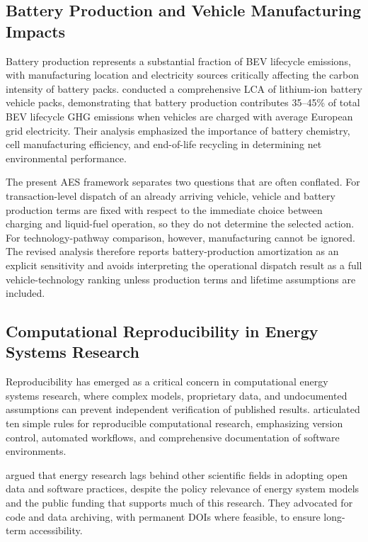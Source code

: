 \documentclass[cleantechnol,article,submit,pdftex,moreauthors]{Definitions/mdpi}
\begin{document}
\subsection{Battery Production and Vehicle Manufacturing Impacts}

Battery production represents a substantial fraction of BEV lifecycle emissions, with manufacturing location and electricity sources critically affecting the carbon intensity of battery packs. \citet{Ellingsen2014} conducted a comprehensive LCA of lithium-ion battery vehicle packs, demonstrating that battery production contributes 35--45\% of total BEV lifecycle GHG emissions when vehicles are charged with average European grid electricity. Their analysis emphasized the importance of battery chemistry, cell manufacturing efficiency, and end-of-life recycling in determining net environmental performance.

The present AES framework separates two questions that are often conflated. For transaction-level dispatch of an already arriving vehicle, vehicle and battery production terms are fixed with respect to the immediate choice between charging and liquid-fuel operation, so they do not determine the selected action. For technology-pathway comparison, however, manufacturing cannot be ignored. The revised analysis therefore reports battery-production amortization as an explicit sensitivity and avoids interpreting the operational dispatch result as a full vehicle-technology ranking unless production terms and lifetime assumptions are included.

\subsection{Computational Reproducibility in Energy Systems Research}

Reproducibility has emerged as a critical concern in computational energy systems research, where complex models, proprietary data, and undocumented assumptions can prevent independent verification of published results. \citet{Sandve2013} articulated ten simple rules for reproducible computational research, emphasizing version control, automated workflows, and comprehensive documentation of software environments.

\citet{Pfenninger2017} argued that energy research lags behind other scientific fields in adopting open data and software practices, despite the policy relevance of energy system models and the public funding that supports much of this research. They advocated for code and data archiving, with permanent DOIs where feasible, to ensure long-term accessibility.
\end{document}
